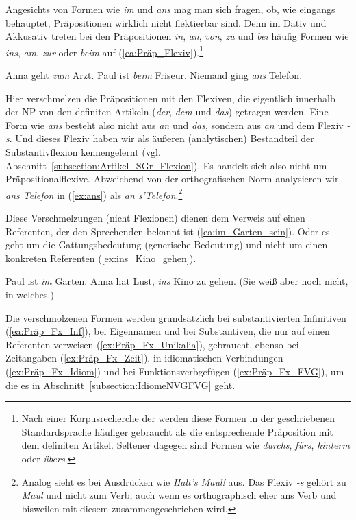 Angesichts von Formen wie \textit{im} und \textit{ans} mag man sich fragen, ob, wie eingangs behauptet, Präpositionen wirklich nicht flektierbar sind. Denn im Dativ und Akkusativ treten bei den Präpositionen \textit{in}, \textit{an}, \textit{von}, \textit{zu} und \textit{bei} häufig Formen wie \textit{ins}, \textit{am}, \textit{zur} oder \textit{beim} auf (\ref{ea:Präp_Flexiv}).\footnote{Nach einer Korpusrecherche der \citet[820, §1453]{Duden2022} werden diese Formen in der geschriebenen Standardsprache häufiger gebraucht als die entsprechende Präposition mit dem definiten Artikel. Seltener dagegen sind Formen wie \textit{durchs}, \textit{fürs}, \textit{hinterm} oder \textit{übers}.}

\ea \label{ea:Präp_Flexiv}
\ea \label{ea:zum} Anna geht \textit{zum} Arzt.
\ex \label{ex:beim} Paul ist \textit{beim} Friseur.
\ex \label{ex:ans} Niemand ging \textit{ans} Telefon.
\z 
\z 

Hier verschmelzen die Präpositionen mit den Flexiven, die eigentlich innerhalb der NP von den definiten Artikeln (\textit{der}, \textit{dem} und \textit{das}) getragen werden. Eine Form wie \textit{ans} besteht also nicht aus \textit{an} und \textit{das}, sondern aus \textit{an} und dem Flexiv \textit{-s}. Und dieses Flexiv haben wir als äußeren (analytischen) Bestandteil der Substantivflexion kennengelernt (vgl. Abschnitt~\ref{subsection:Artikel_SGr_Flexion}). Es handelt sich also nicht um Präpositionalflexive. Abweichend von der orthografischen Norm analysieren wir \textit{ans Telefon} in (\ref{ex:ans}) als \textit{an s'Telefon}.\footnote{Analog sieht es bei Ausdrücken wie \textit{Halt's Maul!} aus. Das Flexiv \textit{-s} gehört zu \textit{Maul} und nicht zum Verb, auch wenn es orthographisch eher ans Verb  und bisweilen mit diesem zusammengeschrieben wird.}

Diese Verschmelzungen (nicht Flexionen) dienen dem Verweis auf einen Referenten, der den Sprechenden bekannt ist (\ref{ea:im_Garten_sein}). Oder es geht um die Gattungsbedeutung (generische Bedeutung) und nicht um einen konkreten Referenten (\ref{ex:ins_Kino_gehen}).

\ea \label{ea:Präp_Verschmelzung}
\ea \label{ea:im_Garten_sein} Paul ist \textit{im} Garten.
\ex \label{ex:ins_Kino_gehen} Anna hat Lust, \textit{ins} Kino zu gehen. (Sie weiß aber noch nicht, in welches.)
\z 
\z 

Die verschmolzenen Formen werden grundsätzlich bei substantivierten Infinitiven (\ref{ea:Präp_Fx_Inf}), bei Eigennamen und bei Substantiven, die nur auf einen Referenten verweisen (\ref{ex:Präp_Fx_Unikalia}), gebraucht, ebenso bei Zeitangaben (\ref{ex:Präp_Fx_Zeit}), in idiomatischen Verbindungen (\ref{ex:Präp_Fx_Idiom}) und bei Funktionsverbgefügen (\ref{ex:Präp_Fx_FVG}), um die es in Abschnitt~\ref{subsection:IdiomeNVGFVG} geht.

